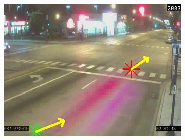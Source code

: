 \begin{figure}
\begin{subfigure}{0.32\linewidth}
            \includegraphics[width=\linewidth]{./img/scene_learning/res/ciceroPeterson/20150829_020000DST_ciceroPeterson-2.jpg}
        \end{subfigure}


\end{figure}
